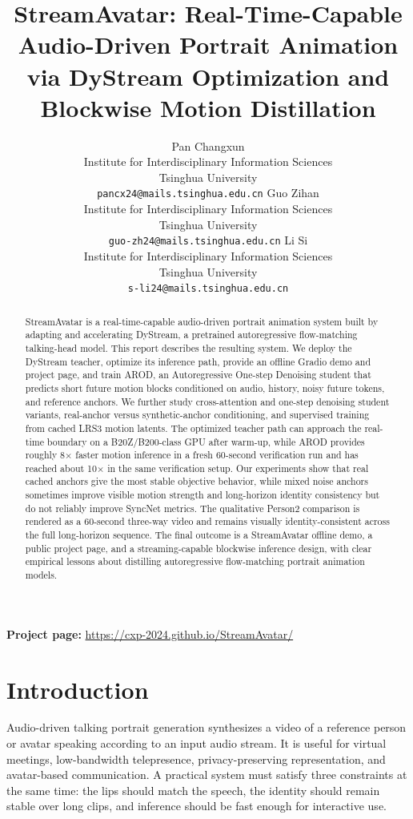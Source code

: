 \documentclass{article}
\title{StreamAvatar: Real-Time-Capable Audio-Driven Portrait Animation via DyStream Optimization and Blockwise Motion Distillation}
\author{%
Pan Changxun\\
Institute for Interdisciplinary Information Sciences\\
Tsinghua University\\
\texttt{pancx24@mails.tsinghua.edu.cn}
\And
Guo Zihan\\
Institute for Interdisciplinary Information Sciences\\
Tsinghua University\\
\texttt{guo-zh24@mails.tsinghua.edu.cn}
\And
Li Si\\
Institute for Interdisciplinary Information Sciences\\
Tsinghua University\\
\texttt{s-li24@mails.tsinghua.edu.cn}
}
\begin{document}
\maketitle
\begin{center}
\textbf{Project page:} \url{https://cxp-2024.github.io/StreamAvatar/}
\end{center}

\begin{abstract}
StreamAvatar is a real-time-capable audio-driven portrait animation system built by adapting and accelerating DyStream, a pretrained autoregressive flow-matching talking-head model. This report describes the resulting system. We deploy the DyStream teacher, optimize its inference path, provide an offline Gradio demo and project page, and train AROD, an Autoregressive One-step Denoising student that predicts short future motion blocks conditioned on audio, history, noisy future tokens, and reference anchors. We further study cross-attention and one-step denoising student variants, real-anchor versus synthetic-anchor conditioning, and supervised training from cached LRS3 motion latents. The optimized teacher path can approach the real-time boundary on a B20Z/B200-class GPU after warm-up, while AROD provides roughly 8$\times$ faster motion inference in a fresh 60-second verification run and has reached about 10$\times$ in the same verification setup. Our experiments show that real cached anchors give the most stable objective behavior, while mixed noise anchors sometimes improve visible motion strength and long-horizon identity consistency but do not reliably improve SyncNet metrics. The qualitative Person2 comparison is rendered as a 60-second three-way video and remains visually identity-consistent across the full long-horizon sequence. The final outcome is a StreamAvatar offline demo, a public project page, and a streaming-capable blockwise inference design, with clear empirical lessons about distilling autoregressive flow-matching portrait animation models.
\end{abstract}

\section{Introduction}

Audio-driven talking portrait generation synthesizes a video of a reference person or avatar speaking according to an input audio stream. It is useful for virtual meetings, low-bandwidth telepresence, privacy-preserving representation, and avatar-based communication. A practical system must satisfy three constraints at the same time: the lips should match the speech, the identity should remain stable over long clips, and inference should be fast enough for interactive use.
\end{document}
